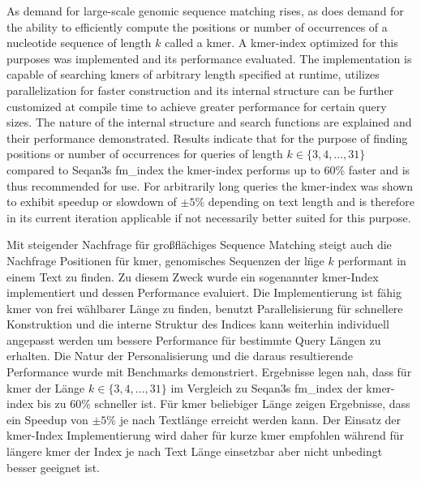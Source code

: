 \begin{abstractEN}
As demand for large-scale genomic sequence matching rises, as does
demand for the ability to efficiently compute the positions or number of occurrences
of a nucleotide sequence of length $k$ called a kmer. A kmer-index optimized for this
purposes was implemented and its performance evaluated. The implementation
is capable of searching kmers of arbitrary length specified at runtime,
utilizes parallelization for faster construction and its internal
structure can be further customized at compile time to achieve greater
performance for certain query sizes. The nature of the internal structure
and search functions are explained and their performance demonstrated.
Results indicate that for the purpose of finding
positions or number of occurrences for queries of
length $k\in\{3,4,...,31\}$ compared to Seqan3s fm\_index the kmer-index
performs up to 60\% faster and is thus recommended for use. For arbitrarily
long queries the kmer-index was shown to exhibit speedup or slowdown
of $\pm5$\% depending on text length and is therefore in its current
iteration applicable if not necessarily better suited for this purpose.
\end{abstractEN}
\vfill

\begin{abstractDE}
Mit steigender Nachfrage f\"ur gro\ss fl\"achiges Sequence Matching steigt
auch die Nachfrage Positionen f\"ur kmer, genomisches Sequenzen der l\"nge $k$ performant
in einem Text zu finden. Zu diesem Zweck wurde ein sogenannter kmer-Index implementiert
und dessen Performance evaluiert. Die Implementierung ist f\"ahig kmer von frei w\"ahlbarer
L\"ange zu finden, benutzt Parallelisierung f\"ur schnellere Konstruktion und die interne
Struktur des Indices kann weiterhin individuell angepasst werden um bessere Performance
f\"ur bestimmte Query L\"angen zu erhalten. Die Natur der Personalisierung und die daraus
resultierende Performance wurde mit Benchmarks demonstriert. Ergebnisse legen nah, 
dass f\"ur kmer der L\"ange $k\in\{3,4,...,31\}$ im Vergleich zu Seqan3s fm\_index der
kmer-index bis zu 60\% schneller ist. F\"ur kmer beliebiger L\"ange zeigen Ergebnisse, 
dass ein Speedup von $\pm5$\% je nach Textl\"ange erreicht werden kann. Der Einsatz der kmer-Index
Implementierung wird daher f\"ur kurze kmer empfohlen w\"ahrend f\"ur l\"angere kmer der Index 
je nach Text L\"ange einsetzbar aber nicht unbedingt besser geeignet ist.
\end{abstractDE}
\vfill

